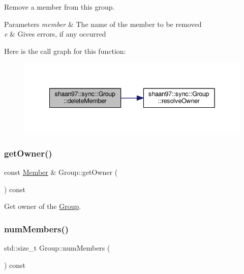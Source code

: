 Remove a member from this group. 
\begin{DoxyParams}{Parameters}
{\em member} & The name of the member to be removed\\
\hline
{\em e} & Gives errors, if any occurred \\
\hline
\end{DoxyParams}
Here is the call graph for this function\+:\nopagebreak
\begin{figure}[H]
\begin{center}
\leavevmode
\includegraphics[width=342pt]{classshaan97_1_1sync_1_1_group_a3dc73fcdebd5cbdb1203b16946e283e7_cgraph}
\end{center}
\end{figure}
\mbox{\label{classshaan97_1_1sync_1_1_group_a3d6110a503531f2179ed290b20242bf5}} 
\subsubsection{\texorpdfstring{get\+Owner()}{getOwner()}}
{\footnotesize\ttfamily const \hyperlink{classshaan97_1_1sync_1_1_member}{Member} \& Group\+::get\+Owner (\begin{DoxyParamCaption}{ }\end{DoxyParamCaption}) const}



Get owner of the \hyperlink{classshaan97_1_1sync_1_1_group}{Group}. 

\mbox{\label{classshaan97_1_1sync_1_1_group_ad887e0961f8c1abe04db7c73b1d4bcd2}} 
\subsubsection{\texorpdfstring{num\+Members()}{numMembers()}}
{\footnotesize\ttfamily std\+::size\+\_\+t Group\+::num\+Members (\begin{DoxyParamCaption}{ }\end{DoxyParamCaption}) const}



